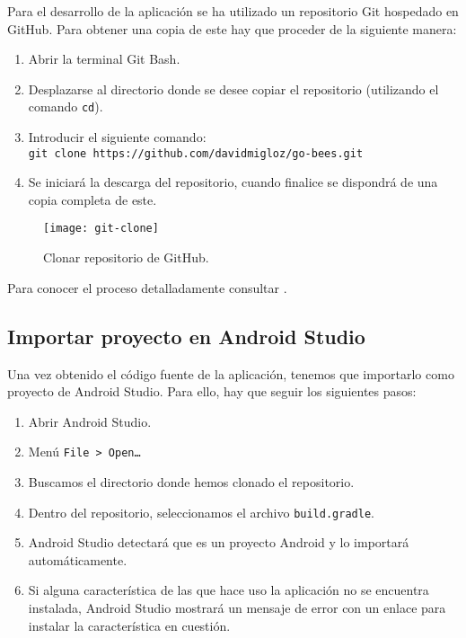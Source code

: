Para el desarrollo de la aplicación se ha utilizado un repositorio Git
hospedado en GitHub. Para obtener una copia de este hay que proceder de
la siguiente manera:

\begin{enumerate}
\def\labelenumi{\arabic{enumi}.}
\tightlist
\item
  Abrir la terminal Git Bash.
\item
  Desplazarse al directorio donde se desee copiar el repositorio
  (utilizando el comando \texttt{cd}).
\item
  Introducir el siguiente comando:\\
  \texttt{git\ clone\ https://github.com/davidmigloz/go-bees.git}
\item
  Se iniciará la descarga del repositorio, cuando finalice se dispondrá
  de una copia completa de este.
\end{enumerate}

\begin{figure}[H]
	\centering
	\texttt{[image: git-clone]}
	\caption{Clonar repositorio de GitHub.}\label{fig:git-clone-1}
\end{figure}

Para conocer el proceso detalladamente consultar \citep{github:clone}.

\subsection{Importar proyecto en Android
Studio}\label{importar-proyecto-en-android-studio}

Una vez obtenido el código fuente de la aplicación, tenemos que
importarlo como proyecto de Android Studio. Para ello, hay que seguir
los siguientes pasos:

\begin{enumerate}
\def\labelenumi{\arabic{enumi}.}
\tightlist
\item
  Abrir Android Studio.
\item
  Menú \texttt{File\ \textgreater{}\ Open\ldots{}}
\item
  Buscamos el directorio donde hemos clonado el repositorio.
\item
  Dentro del repositorio, seleccionamos el archivo
  \texttt{build.gradle}.
\item
  Android Studio detectará que es un proyecto Android y lo importará
  automáticamente.
\item
  Si alguna característica de las que hace uso la aplicación no se
  encuentra instalada, Android Studio mostrará un mensaje de error con
  un enlace para instalar la característica en cuestión.
\end{enumerate}

